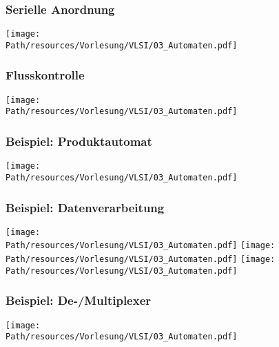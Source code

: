 	\subsubsection{Serielle Anordnung}
		\begin{center}
			\texttt{[image: \\Path/resources/Vorlesung/VLSI/03\_Automaten.pdf]}
		\end{center}
		
	\subsubsection{Flusskontrolle}
		\begin{center}
			\texttt{[image: \\Path/resources/Vorlesung/VLSI/03\_Automaten.pdf]}
		\end{center}
		
	\subsubsection{Beispiel: Produktautomat}
		\begin{center}
			\texttt{[image: \\Path/resources/Vorlesung/VLSI/03\_Automaten.pdf]}
		\end{center}
		
	\subsubsection{Beispiel: Datenverarbeitung}
		\begin{center}
			\texttt{[image: \\Path/resources/Vorlesung/VLSI/03\_Automaten.pdf]}
			\texttt{[image: \\Path/resources/Vorlesung/VLSI/03\_Automaten.pdf]}
			\texttt{[image: \\Path/resources/Vorlesung/VLSI/03\_Automaten.pdf]}
		\end{center}
		
	\subsubsection{Beispiel: De-/Multiplexer}
		\begin{center}
			\texttt{[image: \\Path/resources/Vorlesung/VLSI/03\_Automaten.pdf]}
		\end{center}

